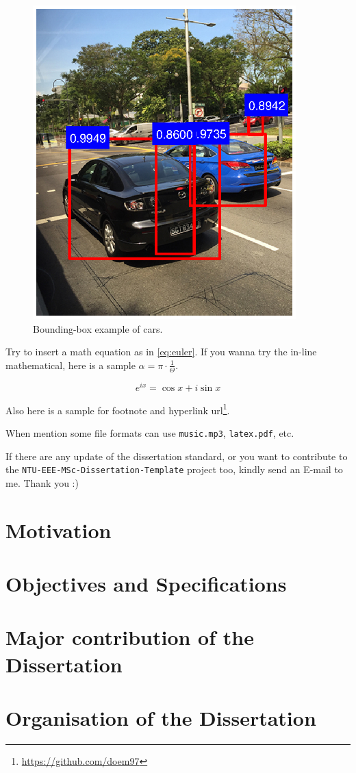 \begin{spacing}{1.5}
\begin{figure}[ht]
\centering
\includegraphics[width=4in, fbox]{Chapter1/boundingbox.eps}
\caption{Bounding-box example of cars.}
\label{fig:boundingboxexample} 
\end{figure}

Try to insert a math equation as in \autoref{eq:euler}. If you wanna try the in-line mathematical, here is a sample $\alpha = \pi \cdot \frac{1}{\Theta}$.

\begin{equation}
\label{eq:euler}
    e^{ix}= \cos{x} + i \sin{x}
\end{equation}

Also here is a sample for footnote and hyperlink url\footnote{\url{https://github.com/doem97}}.

When mention some file formats can use \texttt{music.mp3}, \texttt{latex.pdf}, etc.

If there are any update of the dissertation standard, or you want to contribute to the \texttt{NTU-EEE-MSc-Dissertation-Template} project too, kindly send an E-mail to me. Thank you :)

\section{Motivation}


\section{Objectives and Specifications}



\section{Major contribution of the Dissertation}



\section{Organisation of the Dissertation}


\end{spacing}
\newpage


